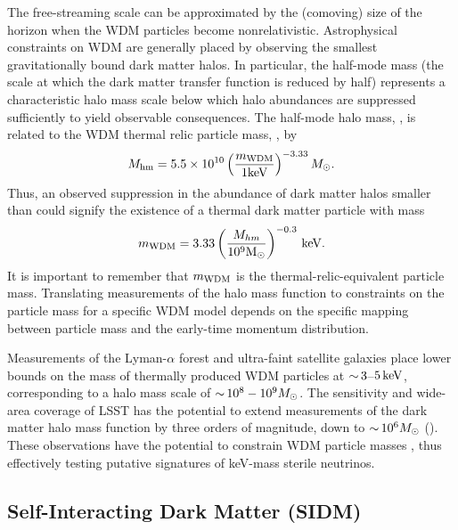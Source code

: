 The free-streaming scale can be approximated by the (comoving) size of the horizon when the WDM particles become nonrelativistic.
Astrophysical constraints on WDM are generally placed by observing the smallest gravitationally bound dark matter halos.  
In particular, the half-mode mass (the scale at which the dark matter transfer function is reduced by half) represents a characteristic halo mass scale below which halo abundances are suppressed sufficiently to yield observable consequences. 
The half-mode halo mass, \Mhm, is related to the WDM thermal relic particle mass, \mWDM, by \citep[\eg][]{schneider2012,Bullock:2017xww}
\begin{equation} \label{eqn:Mhm}
    M_{\rm hm} = 5.5 \times 10^{10} \left( \frac{m_{\rm WDM}}{1 {\rm keV}} \right)^{-3.33} M_\odot.
\end{equation}
Thus, an observed suppression in the abundance of dark matter halos smaller than \Mhm could signify the existence of a thermal dark matter particle with mass
\begin{equation} \label{eqn:mWDM}
    m_{\rm WDM} =  3.33 \left(\frac{M_{hm}}{10^{9} {\rm M_\odot}} \right)^{-0.3} \mathrm{\,keV}.
\end{equation}
It is important to remember that $m_{\rm WDM}$ is the thermal-relic-equivalent particle mass. Translating measurements of the halo mass function to constraints on the particle mass for a specific WDM model depends on the specific mapping between particle mass and the early-time momentum distribution.

Measurements of the Lyman-$\alpha$ forest \citep[\eg][]{Viel:2013,2017PhRvD..96b3522I} and ultra-faint satellite galaxies \citep[\eg][]{Jethwa:2018,Kim:2017iwr} place lower bounds on the mass of thermally produced WDM particles at $ {\sim}\, 3$--$5\mathrm{\,keV}$, corresponding to a halo mass scale of $ {\sim}\, 10^8-10^9 M_\odot$.
The sensitivity and wide-area coverage of LSST has the potential to extend measurements of the dark matter halo mass function by three orders of magnitude, down to $ {\sim}\, 10^6 M_\odot$ (). 
These observations have the potential to constrain WDM particle masses , thus effectively testing putative signatures of keV-mass sterile neutrinos.


\subsection{Self-Interacting Dark Matter (SIDM)}
\label{sec:sidm}

